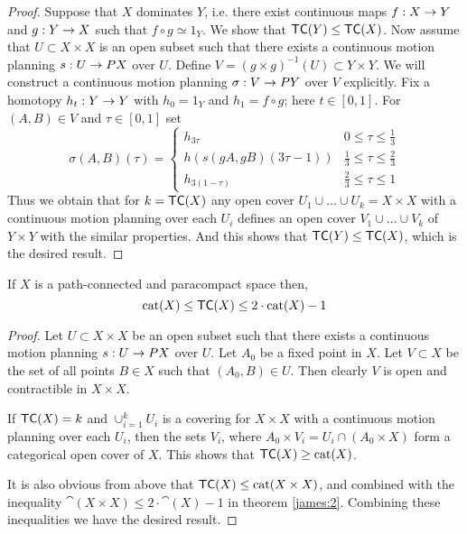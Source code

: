 \begin{proof}
    Suppose that $X$ dominates $Y$, i.e. there exist continuous maps $f: X \rightarrow Y$ and $g: Y \rightarrow X$ such that $f \circ g \simeq 1_Y$. We show that $\textsf{TC}(Y) \le \textsf{TC}(X)$. Now assume that $U \subset X \times X$ is an open subset such that there exists a continuous motion planning $s : U \rightarrow PX$ over $U$. Define $V = (g \times g)^{-1}(U) \subset Y \times Y$. We will construct a continuous motion planning $\sigma: V \rightarrow PY$ over $V$ explicitly. Fix a homotopy $h_t: Y \rightarrow Y$ with $h_0 = 1_Y$ and $h_1 = f \circ g$; here $t \in [0,1]$. For $(A,B) \in V$ and $\tau \in [0,1]$ set
    \[
        \sigma(A,B)(\tau) = \begin{cases}
            h_{3\tau}               & 0 \le \tau \le \frac13       \\
            h(s(gA, gB)(3\tau - 1)) & \frac13 \le \tau \le \frac23 \\
            h_{3(1 - \tau)}         & \frac23 \le \tau \le 1
        \end{cases}
    \]
    Thus we obtain that for $k = \textsf{TC}(X)$ any open cover $U_1 \cup \ldots \cup U_k = X \times X$ with a continuous motion planning over each $U_i$ defines an open cover $V_1 \cup \ldots \cup V_k$ of $Y \times Y$ with the similar properties. And this shows that $\textsf{TC}(Y) \le \textsf{TC}(X)$, which is the desired result.
\end{proof}

\begin{thm}\label{upper:bound:lemma}
    If $X$ is a path-connected and paracompact space then,
    \[
        \operatorname{cat}(X) \le \textsf{TC}(X) \le 2 \cdot \operatorname{cat}(X) - 1
    \]
\end{thm}

\begin{proof}
    Let $U \subset X \times X$ be an open subset such that there exists a continuous motion planning $s: U \rightarrow PX$ over $U$. Let $A_0$ be a fixed point in $X$. Let $V \subset X$ be the set of all points $B \in X$ such that $(A_0, B) \in U$. Then clearly $V$ is open and contractible in $X \times X$.

    If $\textsf{TC}(X) = k$ and $\cup_{i=1}^{k}U_i$ is a covering for $X \times X$ with a continuous motion planning over each $U_i$, then the sets $V_i$, where $A_0 \times V_i = U_i \cap (A_0 \times X)$ form a categorical open cover of $X$. This shows that $\textsf{TC}(X) \ge \operatorname{cat}(X)$.

    It is also obvious from above that $\textsf{TC}(X) \le \operatorname{cat}(X \times X)$, and combined with the inequality $\cat(X \times X) \le 2 \cdot \cat(X) - 1$ in theorem \ref{james:2}. Combining these inequalities we have the desired result.
\end{proof}

